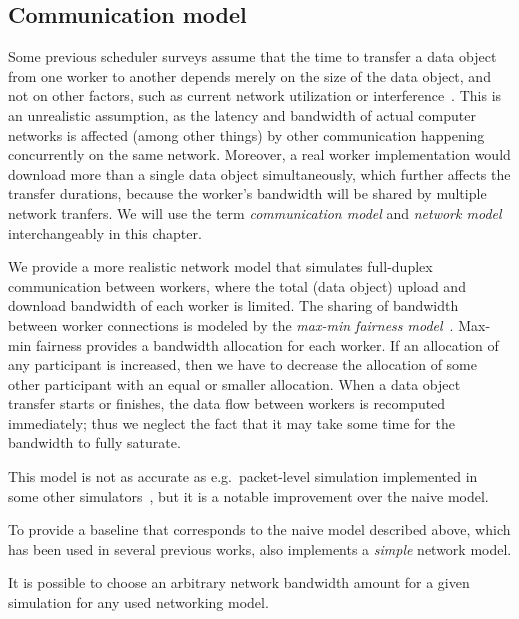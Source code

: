 \subsection{Communication model}
Some previous scheduler surveys assume that the time to transfer a data object from one worker to
another depends merely on the size of the data object, and not on other factors, such as current
network utilization or interference~\cite{tang2010list,yao2013task,wang2018list,kwok1996dynamic}. This is an unrealistic assumption, as
the latency and bandwidth of actual computer networks is affected (among other things) by other
communication happening concurrently on the same network. Moreover, a real worker implementation
would download more than a single data object simultaneously, which further affects the transfer
durations, because the worker's bandwidth will be shared by multiple network tranfers. We will use
the term \emph{communication model} and \emph{network model} interchangeably in this chapter.

We provide a more realistic network model that simulates full-duplex communication between workers,
where the total (data object) upload and download bandwidth of each worker is limited. The sharing
of bandwidth between worker connections is modeled by the
\emph{max-min fairness model}~\cite{bertsekas_1992}. Max-min fairness provides a bandwidth allocation
for each worker. If an allocation of any participant is increased, then we have to
decrease the allocation of some other participant with an equal or smaller allocation. When a data
object transfer starts or finishes, the data flow between workers is recomputed immediately; thus
we neglect the fact that it may take some time for the bandwidth to fully saturate.

This model is not as accurate as e.g.\ packet-level simulation implemented in some other
simulators~\cite{simgrid}, but it is a notable improvement over the naive model.

To provide a baseline that corresponds to the naive model described above, which has been used in
several previous works, \estee{} also implements a \emph{simple} network
model.

It is possible to choose an arbitrary network bandwidth amount for a given simulation for any used
networking model.


